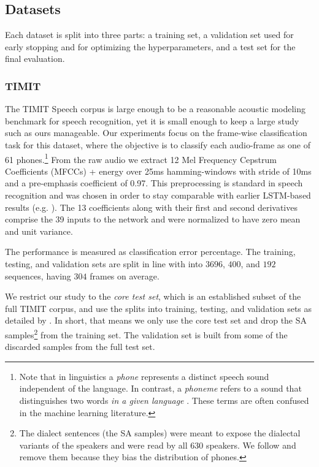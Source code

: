 \subsection{Datasets}
Each dataset is split into three parts: a training set, a validation set used for early stopping and for optimizing the hyperparameters, and a test set for the final evaluation.

\subsubsection*{TIMIT}
\label{sec:timit}
The TIMIT Speech corpus \cite{Garofolo1993} is large enough to be a reasonable acoustic modeling benchmark for speech recognition, yet it is small enough to keep a large study such as ours manageable. Our experiments focus on the frame-wise classification task for this dataset, where the objective is to classify each audio-frame as one of 61 phones.\footnote{Note that in linguistics a \emph{phone} represents a distinct speech sound independent of the language. In contrast, a \emph{phoneme} refers to a sound that distinguishes two words \emph{in a given language} \cite{Crystal2011}. These terms are often confused in the machine learning literature.} From the raw audio we extract 12 Mel Frequency Cepstrum Coefficients (MFCCs) \citep{Mermelstein1976} + energy over 25ms hamming-windows with stride of 10ms and a pre-emphasis coefficient of 0.97. This preprocessing is standard in speech recognition and was chosen in order to stay comparable with earlier LSTM-based results (e.g. \cite{Graves2005, Graves2008a}). The 13 coefficients along with their first and second derivatives comprise the 39 inputs to the network and were normalized to have zero mean and unit variance.

The performance is measured as classification error percentage. The training, testing, and validation sets are split in line with \citet{Halberstadt1998} into $3696$, $400$, and $192$ sequences, having $304$ frames on average.

We restrict our study to the \textit{core test set}, which is an established subset of the full TIMIT corpus, and use the splits into training, testing, and validation sets as detailed by \citet{Halberstadt1998}. 
In short, that means we only use the core test set and drop the SA samples\footnote{The dialect sentences (the SA samples) were meant to expose the dialectal variants of the speakers and were read by all 630 speakers. We follow \cite{Halberstadt1998} and remove them because they bias the distribution of phones.} from the training set. The validation set is built from some of the discarded samples from the full test set. 


